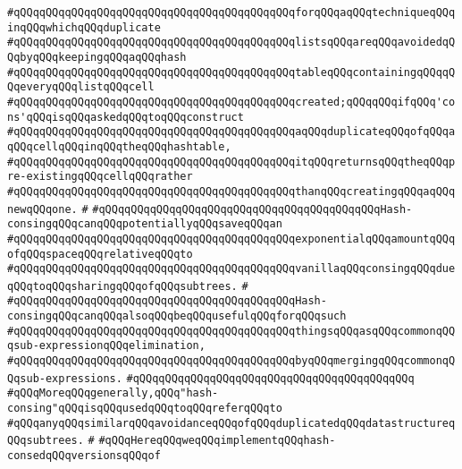 \verb|#qQQqqQQqqQQqqQQqqQQqqQQqqQQqqQQqqQQqqQQqqQQqforqQQqaqQQqtechniqueqQQqinqQQqwhichqQQqduplicate|\newline
\verb|#qQQqqQQqqQQqqQQqqQQqqQQqqQQqqQQqqQQqqQQqqQQqlistsqQQqareqQQqavoidedqQQqbyqQQqkeepingqQQqaqQQqhash|\newline
\verb|#qQQqqQQqqQQqqQQqqQQqqQQqqQQqqQQqqQQqqQQqqQQqtableqQQqcontainingqQQqqQQqeveryqQQqlistqQQqcell|\newline
\verb|#qQQqqQQqqQQqqQQqqQQqqQQqqQQqqQQqqQQqqQQqqQQqcreated;qQQqqQQqifqQQq'cons'qQQqisqQQqaskedqQQqtoqQQqconstruct|\newline
\verb|#qQQqqQQqqQQqqQQqqQQqqQQqqQQqqQQqqQQqqQQqqQQqaqQQqduplicateqQQqofqQQqaqQQqcellqQQqinqQQqtheqQQqhashtable,|\newline
\verb|#qQQqqQQqqQQqqQQqqQQqqQQqqQQqqQQqqQQqqQQqqQQqitqQQqreturnsqQQqtheqQQqpre-existingqQQqcellqQQqrather|\newline
\verb|#qQQqqQQqqQQqqQQqqQQqqQQqqQQqqQQqqQQqqQQqqQQqthanqQQqcreatingqQQqaqQQqnewqQQqone.|\newline
\verb|#|\newline
\verb|#qQQqqQQqqQQqqQQqqQQqqQQqqQQqqQQqqQQqqQQqqQQqHash-consingqQQqcanqQQqpotentiallyqQQqsaveqQQqan|\newline
\verb|#qQQqqQQqqQQqqQQqqQQqqQQqqQQqqQQqqQQqqQQqqQQqexponentialqQQqamountqQQqofqQQqspaceqQQqrelativeqQQqto|\newline
\verb|#qQQqqQQqqQQqqQQqqQQqqQQqqQQqqQQqqQQqqQQqqQQqvanillaqQQqconsingqQQqdueqQQqtoqQQqsharingqQQqofqQQqsubtrees.|\newline
\verb|#|\newline
\verb|#qQQqqQQqqQQqqQQqqQQqqQQqqQQqqQQqqQQqqQQqqQQqHash-consingqQQqcanqQQqalsoqQQqbeqQQqusefulqQQqforqQQqsuch|\newline
\verb|#qQQqqQQqqQQqqQQqqQQqqQQqqQQqqQQqqQQqqQQqqQQqthingsqQQqasqQQqcommonqQQqsub-expressionqQQqelimination,|\newline
\verb|#qQQqqQQqqQQqqQQqqQQqqQQqqQQqqQQqqQQqqQQqqQQqbyqQQqmergingqQQqcommonqQQqsub-expressions.|\newline
\verb|#qQQqqQQqqQQqqQQqqQQqqQQqqQQqqQQqqQQqqQQqqQQq|\newline
\verb|#qQQqMoreqQQqgenerally,qQQq"hash-consing"qQQqisqQQqusedqQQqtoqQQqreferqQQqto|\newline
\verb|#qQQqanyqQQqsimilarqQQqavoidanceqQQqofqQQqduplicatedqQQqdatastructureqQQqsubtrees.|\newline
\verb|#|\newline
\verb|#qQQqHereqQQqweqQQqimplementqQQqhash-consedqQQqversionsqQQqof|\newline
